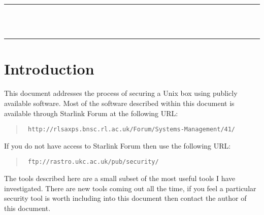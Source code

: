 \stardocabstract
 \newpage
 \begin{latexonly}
   \begin {center}
     \rule{80mm}{0.5mm} \\ [1ex]
   \vspace{5mm}
     {\Large\bf \stardoctitle} \\ [2.5ex]
      \rule{80mm}{0.5mm}
   \end{center}
   \vspace{30mm}
   \setlength{\parskip}{0mm}
   \latexonlytoc
   \setlength{\parskip}{\medskipamount}
   \markright{\stardocname}
 \end{latexonly}
\newpage
\renewcommand{\thepage}{\arabic{page}}
\setcounter{page}{1}

\section{\label{introduction}Introduction} 

This document addresses the process of securing a Unix
box using publicly available software. Most of the software described within
this document is available through Starlink Forum at the following URL:

\begin{quote}{\tt
{}
{http://rlsaxps.bnsc.rl.ac.uk/Forum/Systems-Management/41/}}
\end{quote}

If you do not have access to Starlink Forum then use the following URL:

\begin{quote}{\tt
{}
{ftp://rastro.ukc.ac.uk/pub/security/}}
\end{quote}

The tools described here are a small subset of the most useful tools
I have investigated. There are new tools coming out all the time, if
you feel a particular security tool is worth including into this
document then contact the author of this document.


